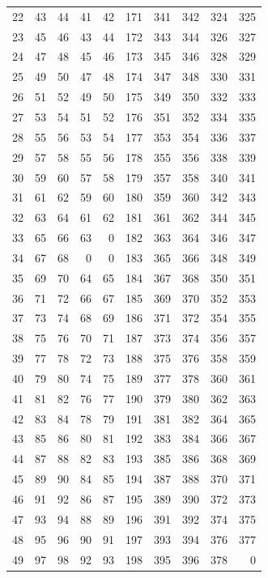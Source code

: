 \begin{longtable}{rrrrr@{\qquad}rrrrr}
22 & 43 & 44 & 41 & 42 & 171 & 341 & 342 & 324 & 325 \\
23 & 45 & 46 & 43 & 44 & 172 & 343 & 344 & 326 & 327 \\
24 & 47 & 48 & 45 & 46 & 173 & 345 & 346 & 328 & 329 \\
25 & 49 & 50 & 47 & 48 & 174 & 347 & 348 & 330 & 331 \\
26 & 51 & 52 & 49 & 50 & 175 & 349 & 350 & 332 & 333 \\
27 & 53 & 54 & 51 & 52 & 176 & 351 & 352 & 334 & 335 \\
28 & 55 & 56 & 53 & 54 & 177 & 353 & 354 & 336 & 337 \\
29 & 57 & 58 & 55 & 56 & 178 & 355 & 356 & 338 & 339 \\
30 & 59 & 60 & 57 & 58 & 179 & 357 & 358 & 340 & 341 \\
31 & 61 & 62 & 59 & 60 & 180 & 359 & 360 & 342 & 343 \\
32 & 63 & 64 & 61 & 62 & 181 & 361 & 362 & 344 & 345 \\
33 & 65 & 66 & 63 & 0 & 182 & 363 & 364 & 346 & 347 \\
34 & 67 & 68 & 0 & 0 & 183 & 365 & 366 & 348 & 349 \\
35 & 69 & 70 & 64 & 65 & 184 & 367 & 368 & 350 & 351 \\
36 & 71 & 72 & 66 & 67 & 185 & 369 & 370 & 352 & 353 \\
37 & 73 & 74 & 68 & 69 & 186 & 371 & 372 & 354 & 355 \\
38 & 75 & 76 & 70 & 71 & 187 & 373 & 374 & 356 & 357 \\
39 & 77 & 78 & 72 & 73 & 188 & 375 & 376 & 358 & 359 \\
40 & 79 & 80 & 74 & 75 & 189 & 377 & 378 & 360 & 361 \\
41 & 81 & 82 & 76 & 77 & 190 & 379 & 380 & 362 & 363 \\
42 & 83 & 84 & 78 & 79 & 191 & 381 & 382 & 364 & 365 \\
43 & 85 & 86 & 80 & 81 & 192 & 383 & 384 & 366 & 367 \\
44 & 87 & 88 & 82 & 83 & 193 & 385 & 386 & 368 & 369 \\
45 & 89 & 90 & 84 & 85 & 194 & 387 & 388 & 370 & 371 \\
46 & 91 & 92 & 86 & 87 & 195 & 389 & 390 & 372 & 373 \\
47 & 93 & 94 & 88 & 89 & 196 & 391 & 392 & 374 & 375 \\
48 & 95 & 96 & 90 & 91 & 197 & 393 & 394 & 376 & 377 \\
49 & 97 & 98 & 92 & 93 & 198 & 395 & 396 & 378 & 0 \\

\end{longtable}
